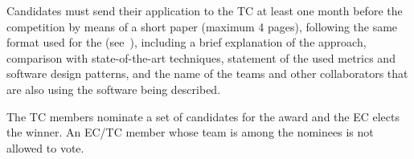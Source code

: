 Candidates must send their application to the TC at least one month before the competition by means of a short paper (maximum 4 pages), following the same format used for the \TDP{} (see~), including a brief explanation of the approach, comparison with state-of-the-art techniques, statement of the used metrics and software design patterns, and the name of the teams and other collaborators that are also using the software being described.

The \AtHome{} TC members nominate a set of candidates for the award and the EC elects the winner.
An EC/TC member whose team is among the nominees is not allowed to vote.



